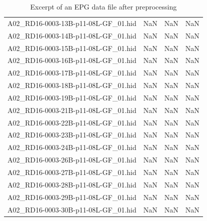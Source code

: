 \begin{landscape}
\begin{table}
\begin{tabular}{lrrr}
 A02\_RD16-0003-13B-p11-08L-GF\_01.hid &                       NaN &                         NaN &                       NaN \\
 A02\_RD16-0003-14B-p11-08L-GF\_01.hid &                       NaN &                         NaN &                       NaN \\
 A02\_RD16-0003-15B-p11-08L-GF\_01.hid &                       NaN &                         NaN &                       NaN \\
 A02\_RD16-0003-16B-p11-08L-GF\_01.hid &                       NaN &                         NaN &                       NaN \\
 A02\_RD16-0003-17B-p11-08L-GF\_01.hid &                       NaN &                         NaN &                       NaN \\
 A02\_RD16-0003-18B-p11-08L-GF\_01.hid &                       NaN &                         NaN &                       NaN \\
 A02\_RD16-0003-19B-p11-08L-GF\_01.hid &                       NaN &                         NaN &                       NaN \\
 A02\_RD16-0003-21B-p11-08L-GF\_01.hid &                       NaN &                         NaN &                       NaN \\
 A02\_RD16-0003-22B-p11-08L-GF\_01.hid &                       NaN &                         NaN &                       NaN \\
 A02\_RD16-0003-23B-p11-08L-GF\_01.hid &                       NaN &                         NaN &                       NaN \\
 A02\_RD16-0003-24B-p11-08L-GF\_01.hid &                       NaN &                         NaN &                       NaN \\
 A02\_RD16-0003-26B-p11-08L-GF\_01.hid &                       NaN &                         NaN &                       NaN \\
 A02\_RD16-0003-27B-p11-08L-GF\_01.hid &                       NaN &                         NaN &                       NaN \\
 A02\_RD16-0003-28B-p11-08L-GF\_01.hid &                       NaN &                         NaN &                       NaN \\
 A02\_RD16-0003-29B-p11-08L-GF\_01.hid &                       NaN &                         NaN &                       NaN \\
 A02\_RD16-0003-30B-p11-08L-GF\_01.hid &                       NaN &                         NaN &                       NaN \\
\bottomrule
\end{tabular}
\caption{Excerpt of an EPG data file after preprocessing}
\label{table:Excerpt of an EPG data file after preprocessing}
\end{table}
\end{landscape}

